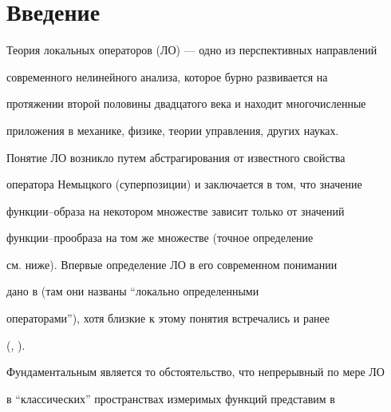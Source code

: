 \date{}




\pagestyle{plain} %







\maketitle


\label{begin}





\section{Введение}





Теория локальных операторов (ЛО) --- одно из перспективных направлений


современного нелинейного анализа, которое бурно развивается на


протяжении второй половины двадцатого века и находит многочисленные


приложения в механике, физике, теории управления, других науках.


Понятие ЛО возникло путем абстрагирования от известного свойства


оператора Немыцкого (су\-пер\-по\-зи\-ции) и заключается в том, что значение


функ\-ции--об\-ра\-за на некотором множестве зависит только от значений


функ\-ции--про\-об\-ра\-за на том же множестве (точ\-ное определение


см. ни\-же). Впервые определение ЛО в его современном понимании


дано в \cite{1} (там они названы ``ло\-каль\-но определенными


опе\-ра\-то\-ра\-ми''), хотя близкие к этому понятия встречались и ранее


(\cite{2}, \cite{3}).





Фундаментальным является то обстоятельство, что непрерывный по мере ЛО


в ``клас\-си\-чес\-ких'' пространствах измеримых функций представим в


